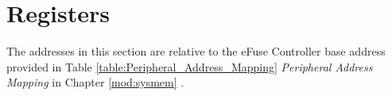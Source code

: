 \documentclass[main\_\_EN.tex]{subfiles}
\begin{document}
\label{15.4}

\clearpage
\section{Registers}
The addresses in this section are relative to the eFuse Controller base address provided in Table \ref{table:Peripheral_Address_Mapping} \textit{Peripheral Address Mapping} in Chapter \ref{mod:sysmem} \textit{}.

\end{document}
